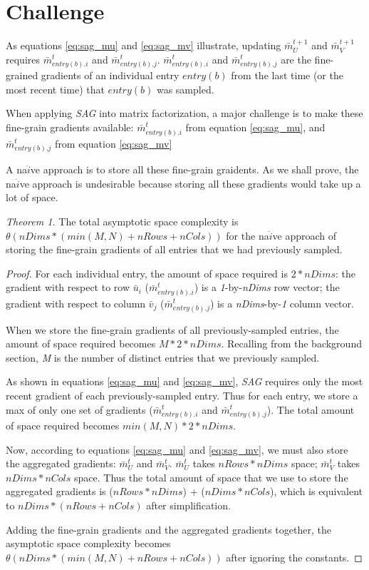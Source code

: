 \section{Challenge}
As equations \ref{eq:sag_mu} and \ref{eq:sag_mv} illustrate, updating $\bar{m}_{U}^{t+1}$ and $\bar{m}_{V}^{t+1}$ requires $\bar{m}_{entry(b).i}^{t}$ and $\bar{m}_{entry(b).j}^{t}$.  
$\bar{m}_{entry(b).i}^{t}$ and $\bar{m}_{entry(b).j}^{t}$ are the fine-grained gradients of an individual entry $entry(b)$ from the last time (or the most recent time) that $entry(b)$ was sampled.  

When applying \emph{SAG} into matrix factorization, a major challenge is to make these fine-grain gradients available: 
$\bar{m}_{entry(b).i}^{t}$ from equation \ref{eq:sag_mu}, and 
$\bar{m}_{entry(b).j}^{t}$ from equation \ref{eq:sag_mv}  

A na$\ddot{i}$ve approach is to store all these fine-grain graidents.  
As we shall prove, the na$\ddot{i}$ve approach is undesirable because storing all these gradients would take up a lot of space.  


\emph{Theorem 1.} 
The total asymptotic space complexity is $\theta(nDims*(min(M,N)+nRows+nCols))$ for the na$\ddot{i}$ve approach of storing the fine-grain gradients of all entries that we had previously sampled.  
\begin{proof}
For each individual entry, the amount of space required is $2*nDims$:  
the gradient with respect to row $\bar{u}_i$ ($\bar{m}_{entry(b).i}^{t}$) is a \emph{1}-by-\emph{nDims} row vector;  
the gradient with respect to column $\bar{v}_j$ ($\bar{m}_{entry(b).j}^{t}$) is a \emph{nDims}-by-\emph{1} column vector.  

When we store the fine-grain gradients of all previously-sampled entries, the amount of space required becomes $M*2*nDims$.  
Recalling from the background section, \emph{M} is the number of distinct entries that we previously sampled.  

As shown in equations \ref{eq:sag_mu} and \ref{eq:sag_mv}, \emph{SAG} requires only the most recent gradient of each previously-sampled entry.
Thus for each entry, we store a max of only one set of gradients ($\bar{m}_{entry(b).i}^{t}$ and $\bar{m}_{entry(b).j}^{t}$).
The total amount of space required becomes $min(M,N)*2*nDims$.

Now, according to equations \ref{eq:sag_mu} and \ref{eq:sag_mv}, we must also store the aggregated gradients: $\bar{m}_{U}^{t}$ and $\bar{m}_{V}^{t}$.  
$\bar{m}_{U}^{t}$ takes $nRows*nDims$ space; $\bar{m}_{V}^{t}$ takes $nDims*nCols$ space.  
Thus the total amount of space that we use to store the aggregated gradients is ($nRows*nDims$) + ($nDims*nCols$), which is equivalent to $nDims*(nRows+nCols)$ after simplification. 

Adding the fine-grain gradients and the aggregated gradients together, the asymptotic space complexity becomes $\theta(nDims*(min(M,N)+nRows+nCols))$ after ignoring the constants.  
\end{proof}


